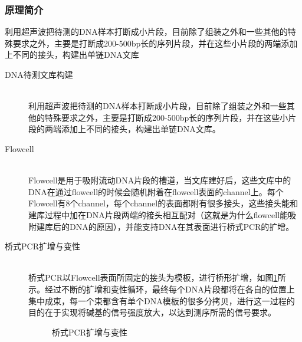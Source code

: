 \documentclass[12pt]{article} %
\begin{document}
\subsubsection{原理简介}

利用超声波把待测的DNA样本打断成小片段，目前除了组装之外和一些其他的特殊要求之外，主要是打断成200-500bp长的序列片段，并在这些小片段的两端添加上不同的接头，构建出单链DNA文库


\begin{description}
	\item[DNA待测文库构建] \hfill \\
	 利用超声波把待测的DNA样本打断成小片段，目前除了组装之外和一些其他的特殊要求之外，主要是打断成200-500bp长的序列片段，并在这些小片段的两端添加上不同的接头，构建出单链DNA文库。
	\item[Flowcell] 　\hfill \\
	Flowcell是用于吸附流动DNA片段的槽道，当文库建好后，这些文库中的DNA在通过flowcell的时候会随机附着在flowcell表面的channel上。每个Flowcell有8个channel，每个channel的表面都附有很多接头，这些接头能和建库过程中加在DNA片段两端的接头相互配对（这就是为什么flowcell能吸附建库后的DNA的原因），并能支持DNA在其表面进行桥式PCR的扩增。
	\item[桥式PCR扩增与变性] \hfill \\ 桥式PCR以Flowcell表面所固定的接头为模板，进行桥形扩增，如图\ref{fig:llumina_a}所示。经过不断的扩增和变性循环，最终每个DNA片段都将在各自的位置上集中成束，每一个束都含有单个DNA模板的很多分拷贝，进行这一过程的目的在于实现将碱基的信号强度放大，以达到测序所需的信号要求。
	
	
	\begin{figure}[H] %
		\caption{桥式PCR扩增与变性}
		\label{fig:llumina_a}
	\end{figure}
	

\end{description}
\end{document}
